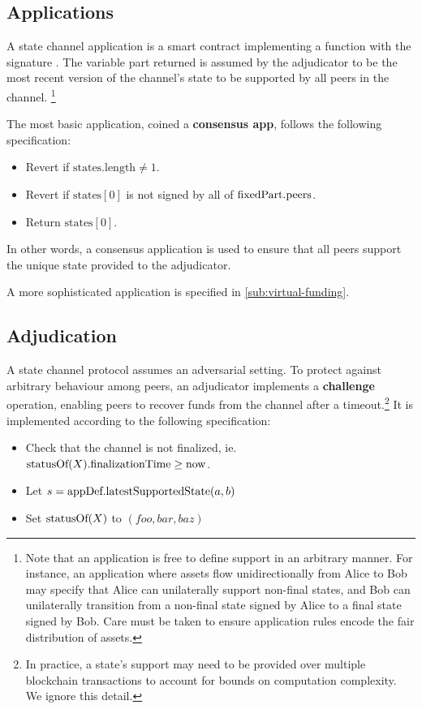\subsection{Applications}

A state channel application is a smart contract implementing a \latestSupportedState function with the signature .
The variable part returned is assumed by the adjudicator to be the most recent version of the channel's state to be supported by all peers in the channel. \footnote{
Note that an application is free to define support in an arbitrary manner. For instance, an application where assets flow unidirectionally from Alice to Bob may specify that Alice can unilaterally support non-final states, and Bob can unilaterally transition from a non-final state signed by Alice to a final state signed by Bob. 
Care must be taken to ensure application rules encode the fair distribution of assets.
}

The most basic application, coined a \textbf{consensus app}, follows the following specification:
\begin{itemize}
  \item Revert if $\mbox{states}.\mbox{length} \neq 1$.
  \item Revert if $\mbox{states}[0]$ is not signed by all of $\mbox{fixedPart}.\mbox{peers}$.
  \item Return $\mbox{states}[0].$
\end{itemize}
In other words, a consensus application is used to ensure that all peers support the unique state provided to the adjudicator.

A more sophisticated application is specified in \ref{sub:virtual-funding}.

\subsection{Adjudication}
A state channel protocol assumes an adversarial setting. To protect against arbitrary behaviour among peers, an adjudicator implements a \textbf{challenge} operation, enabling peers to recover funds from the channel after a timeout.\footnote{In practice, a state's support may need to be provided over multiple blockchain transactions to account for bounds on computation complexity. We ignore this detail.} It is implemented according to the following specification:
\begin{itemize}
  \item Check that the channel is not finalized, ie. $\mbox{statusOf}(X).\mbox{finalizationTime} \ge \mbox{now}$.
  \item Let $s = \mbox{appDef}.\mbox{latestSupportedState}(a, b)$
  \item Set $\mbox{statusOf}(X)$ to $(foo, bar, baz)$
\end{itemize}



